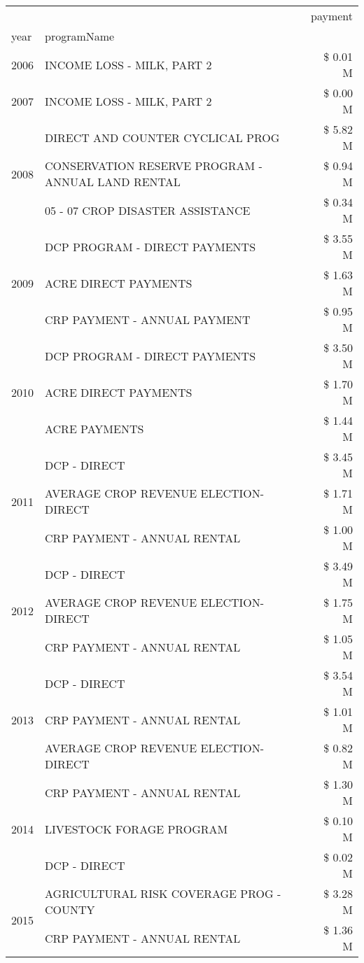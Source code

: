 \begin{tabular}{llr}
\toprule
 &  & payment \\
year & programName &  \\
\midrule
2006 & INCOME LOSS - MILK, PART 2 & \$ 0.01 M \\
\cline{1-3}
2007 & INCOME LOSS - MILK, PART 2 & \$ 0.00 M \\
\cline{1-3}
\multirow[t]{3}{*}{2008} & DIRECT AND COUNTER CYCLICAL PROG & \$ 5.82 M \\
 & CONSERVATION RESERVE PROGRAM - ANNUAL LAND RENTAL & \$ 0.94 M \\
 & 05 - 07 CROP DISASTER ASSISTANCE & \$ 0.34 M \\
\cline{1-3}
\multirow[t]{3}{*}{2009} & DCP PROGRAM - DIRECT PAYMENTS & \$ 3.55 M \\
 & ACRE DIRECT PAYMENTS & \$ 1.63 M \\
 & CRP PAYMENT - ANNUAL PAYMENT & \$ 0.95 M \\
\cline{1-3}
\multirow[t]{3}{*}{2010} & DCP PROGRAM - DIRECT PAYMENTS & \$ 3.50 M \\
 & ACRE DIRECT PAYMENTS & \$ 1.70 M \\
 & ACRE PAYMENTS & \$ 1.44 M \\
\cline{1-3}
\multirow[t]{3}{*}{2011} & DCP - DIRECT & \$ 3.45 M \\
 & AVERAGE CROP REVENUE ELECTION-DIRECT & \$ 1.71 M \\
 & CRP PAYMENT - ANNUAL RENTAL & \$ 1.00 M \\
\cline{1-3}
\multirow[t]{3}{*}{2012} & DCP - DIRECT & \$ 3.49 M \\
 & AVERAGE CROP REVENUE ELECTION-DIRECT & \$ 1.75 M \\
 & CRP PAYMENT - ANNUAL RENTAL & \$ 1.05 M \\
\cline{1-3}
\multirow[t]{3}{*}{2013} & DCP - DIRECT & \$ 3.54 M \\
 & CRP PAYMENT - ANNUAL RENTAL & \$ 1.01 M \\
 & AVERAGE CROP REVENUE ELECTION-DIRECT & \$ 0.82 M \\
\cline{1-3}
\multirow[t]{3}{*}{2014} & CRP PAYMENT - ANNUAL RENTAL & \$ 1.30 M \\
 & LIVESTOCK FORAGE PROGRAM & \$ 0.10 M \\
 & DCP - DIRECT & \$ 0.02 M \\
\cline{1-3}
\multirow[t]{3}{*}{2015} & AGRICULTURAL RISK COVERAGE PROG - COUNTY & \$ 3.28 M \\
 & CRP PAYMENT - ANNUAL RENTAL & \$ 1.36 M \\

\end{tabular}
